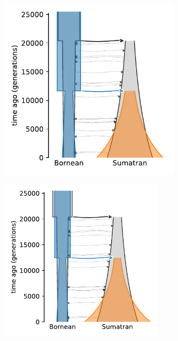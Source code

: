 \begin{figure}[ht]
    \centering
    \begin{subfigure}[b]{0.24\linewidth}
        \centering
        \includegraphics[width=\textwidth]{images_experiments/suimulation_2_stdpopsim/ORAN-NOMIG/oran-nomig-sfs.pdf}
        \caption{}
        \label{fig:part2:experiments:sim2:results:oran_nomig_sfs}
    \end{subfigure}%
    \begin{subfigure}[b]{0.24\linewidth}
        \centering
        \includegraphics[width=0.9\textwidth]{images_experiments/suimulation_2_stdpopsim/ORAN-NOMIG/oran-nomig-ld.pdf}

\end{subfigure}
\end{figure}
